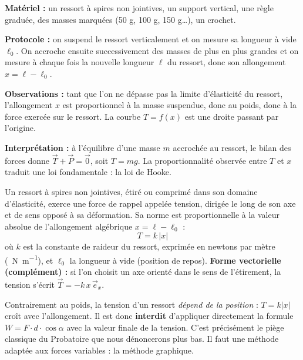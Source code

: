\documentclass[11pt]{article}
\newcommand{\cle}[1]{{\popxbold\color{popdark}#1}}
\begin{document}
\begin{experience}
\textbf{Matériel :} un ressort à spires non jointives, un support vertical, une règle graduée, des masses marquées (50 g, 100 g, 150 g\ldots), un crochet.

\textbf{Protocole :} on suspend le ressort verticalement et on mesure sa longueur à vide $\ell_0$. On accroche ensuite successivement des masses de plus en plus grandes et on mesure à chaque fois la nouvelle longueur $\ell$ du ressort, donc son allongement $x = \ell - \ell_0$.

\textbf{Observations :} tant que l'on ne dépasse pas la limite d'élasticité du ressort, l'allongement $x$ est proportionnel à la masse suspendue, donc au poids, donc à la force exercée sur le ressort. La courbe $T = f(x)$ est une droite passant par l'origine.

\textbf{Interprétation :} à l'équilibre d'une masse $m$ accrochée au ressort, le bilan des forces donne $\vec{T} + \vec{P} = \vec{0}$, soit $T = mg$. La proportionnalité observée entre $T$ et $x$ traduit une loi fondamentale : la loi de Hooke.
\end{experience}

\begin{definition}
Un ressort à spires non jointives, étiré ou comprimé dans son domaine d'élasticité, exerce une force de rappel appelée \cle{tension}, dirigée le long de son axe et de sens opposé à sa déformation. Sa norme est proportionnelle à la valeur absolue de l'\cle{allongement algébrique} $x = \ell - \ell_0$ :
\[
T = k\,|x|
\]
où $k$ est la \cle{constante de raideur} du ressort, exprimée en newtons par mètre (\SI{}{N.m^{-1}}), et $\ell_0$ la longueur à vide (position de repos).
\textbf{Forme vectorielle (complément) :} si l'on choisit un axe orienté dans le sens de l'étirement, la tension s'écrit $\vec{T} = -k\,x\,\vec{e}_x$.
\end{definition}

\begin{attention}
Contrairement au poids, la tension d'un ressort \emph{dépend de la position} : $T = k|x|$ croît avec l'allongement. Il est donc \textbf{interdit} d'appliquer directement la formule $W = F \cdot d \cdot \cos\alpha$ avec la valeur finale de la tension. C'est précisément le piège classique du Probatoire que nous dénoncerons plus bas. Il faut une méthode adaptée aux forces variables : la méthode graphique.
\end{attention}
\end{document}
